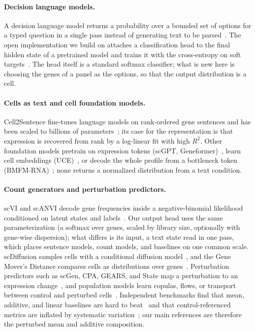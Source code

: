\documentclass[10pt]{article}
\makeatletter
\renewcommand\section{\@startsection{section}{1}{\z@}{-3.5ex \@plus -1ex \@minus -.2ex}{2.3ex \@plus.2ex}{\normalfont\Large\bfseries\raggedright\hyphenpenalty=10000}}
\makeatother
\begin{document}
\section{Related work}\label{sec:background}
\paragraph{Decision language models.}
A decision language model returns a probability over a bounded set of options for a typed question in a single pass instead of generating text to be parsed~\citep{typesafe2026jev,deusser2026jev}. The open implementation we build on attaches a classification head to the final hidden state of a pretrained model and trains it with the cross-entropy on soft targets~\citep{unsloth_decision}. The head itself is a standard softmax classifier; what is new here is choosing the genes of a panel as the options, so that the output distribution is a cell.

\paragraph{Cells as text and cell foundation models.}
Cell2Sentence fine-tunes language models on rank-ordered gene sentences and has been scaled to billions of parameters~\citep{levine2024cell2sentence,rizvi2025c2sscale}; its case for the representation is that expression is recovered from rank by a log-linear fit with high $R^2$. Other foundation models pretrain on expression tokens (scGPT, Geneformer)~\citep{cui2024scgpt,theodoris2023geneformer}, learn cell embeddings (UCE)~\citep{rosen2023uce}, or decode the whole profile from a bottleneck token (BMFM-RNA)~\citep{danziger2025bmfm}; none returns a normalized distribution from a text condition.

\paragraph{Count generators and perturbation predictors.}
scVI and scANVI decode gene frequencies inside a negative-binomial likelihood conditioned on latent states and labels~\citep{lopez2018scvi,xu2021scanvi}. Our output head uses the same parameterization (a softmax over genes, scaled by library size, optionally with gene-wise dispersion); what differs is its input, a text state read in one pass, which places sentence models, count models, and baselines on one common scale. scDiffusion samples cells with a conditional diffusion model~\citep{luo2024scdiffusion}, and the Gene Mover's Distance compares cells as distributions over genes~\citep{gmd2021}. Perturbation predictors such as scGen, CPA, GEARS, and State map a perturbation to an expression change~\citep{lotfollahi2019scgen,lotfollahi2023cpa,roohani2024gears,adduri2025state}, and population models learn copulas, flows, or transport between control and perturbed cells~\citep{wang2026poppert,yu2026scdfm,chen2026scale,han2026tempobridge,chi2025departures,jiang2026ocoot}. Independent benchmarks find that mean, additive, and linear baselines are hard to beat~\citep{ahlmann2025deep,wei2026benchmark} and that control-referenced metrics are inflated by systematic variation~\citep{vinas2025systema}; our main references are therefore the perturbed mean and additive composition.
\end{document}
